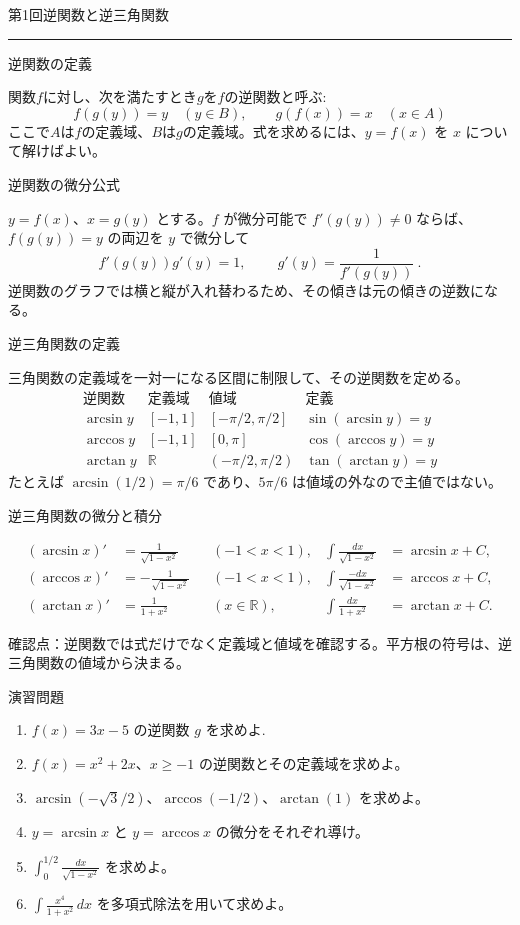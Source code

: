\documentclass[a4paper,10pt,pdflatex,ja=standard,jafont=ipaex-type1,
  magstyle=real,scale=1]{bxjsarticle}
\newcommand{\handoutnumber}{1}
\newcommand{\handouttitle}[1]{%
  \begin{center}
    {\Large\color{ink}#1}\par\vspace{3mm}
    {\color{accent}\rule{0.88\linewidth}{0.7pt}}
  \end{center}\vspace{-2mm}}
\newcommand{\handout}[2]{%
  \renewcommand{\handoutnumber}{#1}%
  \handouttitle{第#1回\quad #2}}
\newcommand{\topic}[1]{\par\vspace{5pt}%
  {\large\sffamily\mdseries\color{accent}#1}\par\vspace{2pt}}
\newcommand{\keybox}[1]{\par\vspace{3pt}\begingroup
  \setlength{\fboxsep}{4pt}%
  \colorbox{soft}{\parbox{\dimexpr\linewidth-2\fboxsep\relax}{\small #1}}%
  \endgroup\par\vspace{2pt}}
\newenvironment{problems}
  {\begin{enumerate}[leftmargin=2em,itemsep=3pt,topsep=3pt,parsep=0pt,
    font=\color{accent}]}
  {\end{enumerate}}
\begin{document}
\newpage
\fontsize{10pt}{13.5pt}\selectfont
\setlength{\abovedisplayskip}{4pt}
\setlength{\belowdisplayskip}{4pt}
\handout{1}{逆関数と逆三角関数}

\topic{逆関数の定義}
関数$f$に対し、次を満たすとき$g$を$f$の逆関数と呼ぶ:
$$
 {\ f(g(y))=y\quad(y\in B),\qquad g(f(x))=x\quad(x\in A)\ }
$$
ここで$A$は$f$の定義域、$B$は$g$の定義域。式を求めるには、$y=f(x)$ を $x$ について解けばよい。

\topic{逆関数の微分公式}
$y=f(x)$、$x=g(y)$ とする。$f$ が微分可能で $f'(g(y))\ne0$ ならば、
$f(g(y))=y$ の両辺を $y$ で微分して
$$
 f'(g(y))g'(y)=1,\qquad
 {\ g'(y)=\frac{1}{f'(g(y))}\ }.
$$
逆関数のグラフでは横と縦が入れ替わるため、その傾きは元の傾きの逆数になる。

\topic{逆三角関数の定義}
三角関数の定義域を一対一になる区間に制限して、その逆関数を定める。
$$
\begin{array}{c|c|c|c}
\text{逆関数}&\text{定義域}&\text{値域}&\text{定義}\\
\hline
\arcsin y&[-1,1]&[-\pi/2,\pi/2]&\sin(\arcsin y)=y\\
\arccos y&[-1,1]&[0,\pi]&\cos(\arccos y)=y\\
\arctan y&\mathbb R&(-\pi/2,\pi/2)&\tan(\arctan y)=y
\end{array}
$$
たとえば $\arcsin(1/2)=\pi/6$ であり、$5\pi/6$ は値域の外なので主値ではない。

\topic{逆三角関数の微分と積分}
$$
\begin{aligned}
(\arcsin x)'&=\frac1{\sqrt{1-x^2}} &&(-1<x<1),&
\int\frac{dx}{\sqrt{1-x^2}}&=\arcsin x+C,\\
(\arccos x)'&=-\frac1{\sqrt{1-x^2}} &&(-1<x<1),&
\int\frac{-dx}{\sqrt{1-x^2}}&=\arccos x+C,\\
(\arctan x)'&=\frac1{1+x^2} &&(x\in\mathbb R),&
\int\frac{dx}{1+x^2}&=\arctan x+C.
\end{aligned}
$$
\keybox{確認点：逆関数では式だけでなく定義域と値域を確認する。平方根の符号は、逆三角関数の値域から決まる。}

\topic{演習問題}
\begin{problems}
\item $f(x)=3x-5$ の逆関数 $g$ を求めよ.
\item $f(x)=x^2+2x$、$x\ge-1$ の逆関数とその定義域を求めよ。
\item $\arcsin(-\sqrt3/2)$、$\arccos(-1/2)$、$\arctan(1)$ を求めよ。
\item $y=\arcsin x$ と $y=\arccos x$ の微分をそれぞれ導け。
\item $\displaystyle\int_0^{1/2}\frac{dx}{\sqrt{1-x^2}}$ を求めよ。
\item $\displaystyle\int\frac{x^4}{1+x^2}\,dx$ を多項式除法を用いて求めよ。
\end{problems}
\end{document}
